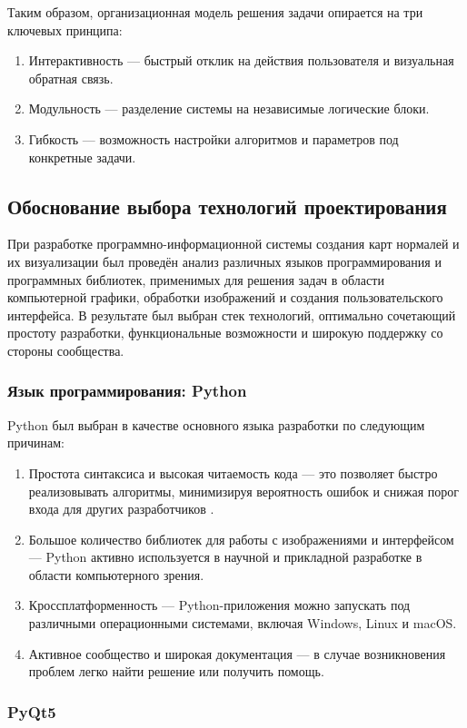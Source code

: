 Таким образом, организационная модель решения задачи опирается на три ключевых принципа:
\begin{enumerate}
	\item Интерактивность — быстрый отклик на действия пользователя и визуальная обратная связь.
	\item Модульность — разделение системы на независимые логические блоки.
	\item Гибкость — возможность настройки алгоритмов и параметров под конкретные задачи.
\end{enumerate}
\subsection{Обоснование выбора технологий проектирования}

При разработке программно-информационной системы создания карт нормалей и их визуализации был проведён анализ различных языков программирования и программных библиотек, применимых для решения задач в области компьютерной графики, обработки изображений и создания пользовательского интерфейса. В результате был выбран стек технологий, оптимально сочетающий простоту разработки, функциональные возможности и широкую поддержку со стороны сообщества.
\subsubsection{Язык программирования: Python}

Python был выбран в качестве основного языка разработки по следующим причинам:
\begin{enumerate}
	\item Простота синтаксиса и высокая читаемость кода — это позволяет быстро реализовывать алгоритмы, минимизируя вероятность ошибок и снижая порог входа для других разработчиков \cite{ravichandiran2020}.
	\item Большое количество библиотек для работы с изображениями и интерфейсом — Python активно используется в научной и прикладной разработке в области компьютерного зрения.
	\item Кроссплатформенность — Python-приложения можно запускать под различными операционными системами, включая Windows, Linux и macOS.
	\item Активное сообщество и широкая документация — в случае возникновения проблем легко найти решение или получить помощь.
\end{enumerate}
\subsubsection{PyQt5}

